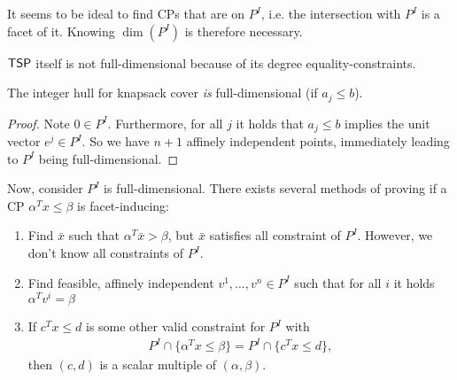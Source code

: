 \begin{observation}
    It seems to be ideal to find CPs that are  on $P^I$, i.e. the intersection with
    $P^I$ is a facet of it. Knowing $\dim(P^I)$ is therefore necessary.
\end{observation}
$\mathsf{TSP}$ itself is not full-dimensional because of its degree equality-constraints.
\begin{theorem}
    The integer hull for knapsack cover \emph{is} full-dimensional (if $a_j \leq b$).
\end{theorem}
\begin{proof}
    Note $0 \in P^I$. Furthermore, for all $j$ it holds that $a_j \leq b$ implies the unit vector $e^j \in P^I$.
    So we have $n+1$ affinely independent points, immediately leading to $P^I$ being full-dimensional.
\end{proof}
Now, consider $P^I$ is full-dimensional.
There exists several methods of proving if a CP $\alpha^Tx \leq \beta$ is facet-inducing:
\begin{enumerate}
    \item Find $\bar x$ such that $\alpha^T\bar x > \beta$, but $\bar x$ satisfies all constraint of $P^I$.
          However, we don't know all constraints of $P^I$.
    \item Find feasible, affinely independent $v^1,\dots,v^n \in P^I$ such that for all $i$ it holds $\alpha^Tv^i = \beta$
    \item If $c^Tx \leq d$ is some other valid constraint for $P^I$ with
          \begin{align*}
              P^I \cap \{\alpha^Tx \leq \beta\} = P^I \cap \{c^Tx \leq d\},
          \end{align*}
          then $(c,d)$ is a scalar multiple of $(\alpha,\beta)$.
\end{enumerate}
